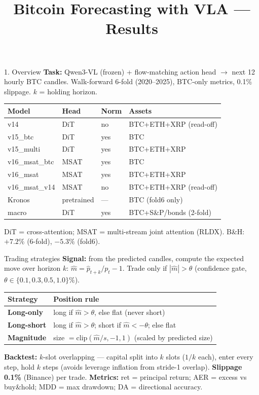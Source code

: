 \documentclass[aspectratio=169]{beamer}
\title{Bitcoin Forecasting with VLA --- Results}\date{}
\begin{document}
\frame{\titlepage}
\begin{frame}{1. Overview}
\small
\textbf{Task:} Qwen3-VL (frozen) + flow-matching action head $\to$ next 12 hourly BTC candles.
Walk-forward 6-fold (2020--2025), BTC-only metrics, 0.1\% slippage. $k$ = holding horizon.
\vspace{.5ex}
\begin{center}\begin{tabular}{llll}
\toprule
Model & Head & Norm & Assets \\ \midrule
v14 & DiT & no & BTC+ETH+XRP (read-off) \\
v15\_btc & DiT & yes & BTC \\
v15\_multi & DiT & yes & BTC+ETH+XRP \\
v16\_msat\_btc & MSAT & yes & BTC \\
v16\_msat & MSAT & yes & BTC+ETH+XRP \\
v16\_msat\_v14 & MSAT & no & BTC+ETH+XRP (read-off) \\ \midrule
Kronos & pretrained & --- & BTC (fold6 only) \\
macro & DiT & yes & BTC+S\&P/bonds (2-fold) \\
\bottomrule
\end{tabular}\end{center}
\footnotesize DiT = cross-attention; MSAT = multi-stream joint attention (RLDX). B\&H: $+7.2\%$ (6-fold), $-5.3\%$ (fold6).
\end{frame}
\begin{frame}{Trading strategies}
\small
\textbf{Signal:} from the predicted candles, compute the expected move over horizon $k$: $\hat{m}=\hat{p}_{t+k}/p_t-1$.
Trade only if $|\hat{m}|>\theta$ (confidence gate, $\theta\in\{0.1,0.3,0.5,1.0\}\%$).
\vspace{.6ex}
\begin{center}\begin{tabular}{ll}
\toprule
Strategy & Position rule \\ \midrule
\textbf{Long-only} & long if $\hat{m}>\theta$, else flat (never short) \\
\textbf{Long-short} & long if $\hat{m}>\theta$; short if $\hat{m}<-\theta$; else flat \\
\textbf{Magnitude} & size $=\mathrm{clip}(\hat{m}/s,-1,1)$ (scaled by predicted size) \\
\bottomrule
\end{tabular}\end{center}
\vspace{.6ex}
\textbf{Backtest:} $k$-slot overlapping --- capital split into $k$ slots ($1/k$ each), enter every step, hold $k$ steps (avoids leverage inflation from stride-1 overlap). \textbf{Slippage 0.1\%} (Binance) per trade.
\vspace{.4ex}
\textbf{Metrics:} ret = principal return; AER = excess vs buy\&hold; MDD = max drawdown; DA = directional accuracy.
\end{frame}
\end{document}
